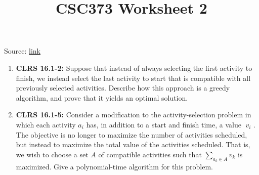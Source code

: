 \documentclass[12pt]{article}
\begin{document}
\title{CSC373 Worksheet 2}
\maketitle

\bigskip

Source: \href{http://www.cs.toronto.edu/~denisp/csc373/material.html}{link}

\begin{enumerate}[1.]
    \item \textbf{CLRS 16.1-2:} Suppose that instead of always selecting the first activity to finish, we instead select
    the last activity to start that is compatible with all previously selected activities. Describe
    how this approach is a greedy algorithm, and prove that it yields an optimal
    solution.

    \item \textbf{CLRS 16.1-5:} Consider a modification to the activity-selection problem in which each activity $a_i$
    has, in addition to a start and finish time, a value $v_i$ . The objective is no longer
    to maximize the number of activities scheduled, but instead to maximize the total
    value of the activities scheduled. That is, we wish to choose a set $A$ of compatible
    activities such that $\sum\limits_{a_k \in A} v_k$ is maximized. Give a polynomial-time algorithm for
    this problem.
\end{enumerate}
\end{document}
